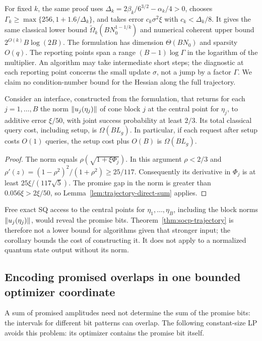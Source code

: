 For fixed $k$, the same proof uses
$\Delta_k=2\beta_k/6^{3/2}-\alpha_k/4>0$, chooses
$\Gamma_k\geq\max\{256,1+1.6/\Delta_k\}$, and takes error
$c_k\sigma^2\xi$ with $c_k<\Delta_k/8$.
It gives the same classical lower bound
$\widetilde\Omega_k(BN_0^{1-1/k})$ and numerical coherent upper bound
$2^{O(k)}B\log(2B)$.
The formulation has dimension $\Theta(BN_0)$ and sparsity $O(q)$.
The reporting points span a range $(B-1)\log\Gamma$ in the logarithm of
the multiplier.  An algorithm may take intermediate short steps; the
diagnostic at each reporting point concerns the small update $\sigma$,
not a jump by a factor $\Gamma$.  We claim no condition-number bound for
the Hessian along the full trajectory.

\begin{corollary}\label{cor:dynamic-norm}
Consider an interface, constructed from the formulation, that returns
for each $j=1,\ldots,B$ the norm $\left\lVert u_j(\eta_j)\right\rVert$ of cone block $j$
at the central point for $\eta_j$, to additive error $\xi/50$, with joint
success probability at least $2/3$.  Its total classical query cost,
including setup, is $\Omega(BL_g)$.  In particular, if each request after
setup costs $O(1)$ queries, the setup cost plus $O(B)$ is
$\Omega(BL_g)$.
\end{corollary}
\begin{proof}
The norm equals $\rho(\sqrt{1+\xi\Phi_j})$.  In this argument
$\rho<2/3$ and
$\rho'(z)=(1-\rho^2)^2/(1+\rho^2)\geq25/117$.
Consequently its derivative in $\Phi_j$ is at least
$25\xi/(117\sqrt5)$.  The promise gap in the norm is greater than
$0.056\xi>2\xi/50$, so Lemma~\ref{lem:trajectory-direct-sum} applies.
\end{proof}

Free exact SQ access to the central points for $\eta_1,\ldots,\eta_B$,
including the block norms $\left\lVert u_j(\eta_j)\right\rVert$, would reveal the promise
bits.  Theorem~\ref{thm:socp-trajectory} is therefore
not a lower bound for algorithms given that stronger input; the corollary
bounds the cost of constructing it.  It does not apply to a normalized
quantum state output without its norm.

\subsection{Encoding promised overlaps in one bounded optimizer coordinate}
A sum of promised amplitudes
need not determine the sum of the promise bits: the intervals for
different bit patterns can overlap.  The following constant-size LP avoids
this problem: its optimizer contains the promise bit itself.

